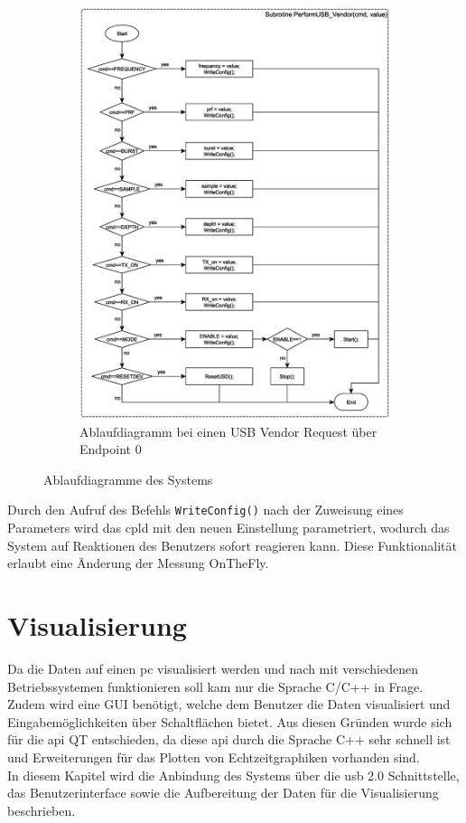 \begin{figure}[h!]
\ContinuedFloat
        \centering
        \begin{subfigure}[b]{0.89\textwidth}
        	 \includegraphics[width=1\textwidth, trim=0mm 0mm 0mm 0mm, clip=true]{images/software/usb_vendor.eps}%
	    		\caption{Ablaufdiagramm bei einen USB Vendor Request über Endpoint 0}
	    		\label{fig:Ablaufusb_vendor}
        \end{subfigure}
        \caption{Ablaufdiagramme des Systems}\label{fig:ablaufdiagramme}
\end{figure}
Durch den Aufruf des Befehls \texttt{WriteConfig()} nach der Zuweisung eines Parameters wird das \ac{cpld} mit den neuen Einstellung parametriert, wodurch das System auf Reaktionen des Benutzers sofort reagieren kann. Diese Funktionalität erlaubt eine Änderung der Messung OnTheFly.
\clearpage
\section{Visualisierung}
Da die Daten auf einen \ac{pc} visualisiert werden und nach  mit verschiedenen Betriebssystemen funktionieren soll kam nur die Sprache C/C++ in Frage. Zudem wird eine GUI benötigt, welche dem Benutzer die Daten visualisiert und Eingabemöglichkeiten über Schaltflächen bietet. Aus diesen Gründen wurde sich für die \ac{api} QT entschieden, da diese \ac{api} durch die Sprache C++ sehr schnell ist und Erweiterungen für das Plotten von Echtzeitgraphiken vorhanden sind.\\
In diesem Kapitel wird die Anbindung des Systems über die \ac{usb} 2.0 Schnittstelle, das Benutzerinterface sowie die Aufbereitung der Daten für die Visualisierung beschrieben.
